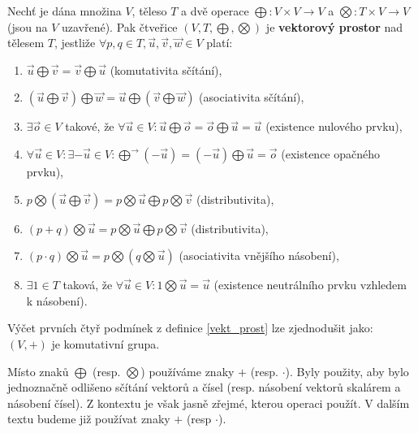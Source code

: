 \begin{definition}\label{vekt_prost}
    Nechť je dána množina $V$, těleso $T$ a dvě operace $\bigoplus: V\times V \to V$ a
    $\bigotimes: T\times V \to V$ (jsou na $V$ uzavřené). Pak čtveřice $(V,T,\bigoplus,
    \bigotimes)$ je \textbf{vektorový prostor} nad tělesem $T$, jestliže $\forall p,q \in T, \vec u,
    \vec v, \vec w \in V$ platí:
    \begin{enumerate}[$i.$]
    \item $\vec u \bigoplus \vec v = \vec v \bigoplus \vec u$ (komutativita sčítání),
   	\item $(\vec u \bigoplus \vec v)\bigoplus \vec w = \vec u \bigoplus (\vec v \bigoplus \vec w)$ (asociativita sčítání),
   	\item $\exists \vec o\in V$ takové, že $\forall \vec u\in V:\vec u \bigoplus \vec o = \vec o \bigoplus \vec u = \vec u$ (existence nulového prvku),
   	\item $\forall \vec u \in V: \exists -\vec u \in V: \vec \bigoplus (-\vec u) = (-\vec u) \bigoplus \vec u = \vec o$ (existence opačného prvku),
   	\item $p\bigotimes (\vec u \bigoplus \vec v)=p\bigotimes \vec u \bigoplus p\bigotimes \vec v$ (distributivita),
   	\item $(p+q)\bigotimes \vec u=p\bigotimes \vec u \bigoplus p\bigotimes \vec v$ (distributivita),
   	\item $(p\cdot q)\bigotimes \vec u = p\bigotimes (q\bigotimes \vec u)$ (asociativita vnějšího násobení),
   	\item $\exists 1 \in T$ taková, že $\forall \vec u \in V: 1\bigotimes \vec u = \vec u$ (existence neutrálního prvku vzhledem k násobení).
    \end{enumerate}
\end{definition}

\begin{pozn}
    Výčet prvních čtyř podmínek z definice \ref{vekt_prost} lze zjednodušit jako:
    $(V,+)$ je komutativní grupa.
\end{pozn}

\begin{pozn}
    Místo znaků $\bigoplus$ (resp. $\bigotimes$) používáme znaky $+$ (resp. $\cdot$).
    Byly použity, aby bylo jednoznačně odlišeno sčítání vektorů a čísel (resp. násobení
    vektorů skalárem a násobení čísel). Z kontextu je však jasně zřejmé, kterou operaci
    použít. V dalším textu budeme již používat znaky $+$ (resp $\cdot$).
\end{pozn}

